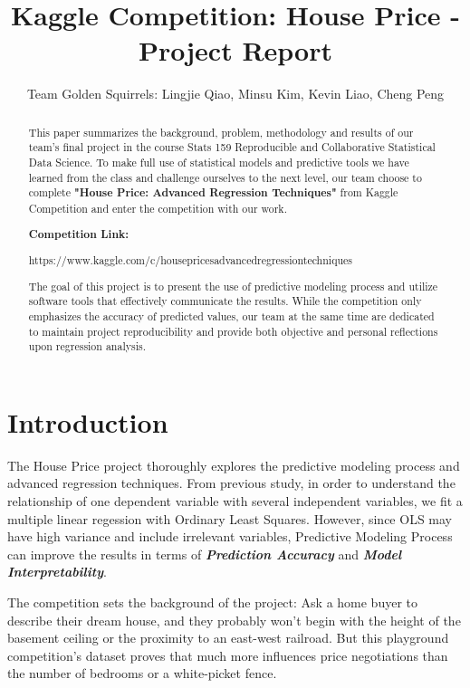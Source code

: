 \documentclass[a4paper]{article}
\title{Kaggle Competition: House Price - Project Report}
\author{Team Golden Squirrels: Lingjie Qiao, Minsu Kim, Kevin Liao, Cheng Peng}
\begin{document}

\maketitle

\begin{abstract}
This paper summarizes the background, problem, methodology and results of our team's final project in the course Stats 159 Reproducible and Collaborative Statistical Data Science. To make full use of statistical models and predictive tools we have learned from the class and challenge ourselves to the next level, our team choose to complete \textbf{"House Price: Advanced Regression Techniques"} from Kaggle Competition and enter the competition with our work. \par

\textbf{Competition Link:} \par
https://www.kaggle.com/c/house\hspace{0pt}prices\hspace{0pt}advanced\hspace{0pt}regression\hspace{0pt}techniques 

The goal of this project is to present the use of predictive modeling process and utilize software tools that effectively communicate the results. While the competition only emphasizes the accuracy of predicted values, our team at the same time are dedicated to maintain project reproducibility and provide both objective and personal reflections upon regression analysis. \par
\end{abstract}

\section{Introduction}
The House Price project thoroughly explores the predictive modeling process and advanced regression techniques. From previous study, in order to understand the relationship of one dependent variable with several independent variables, we fit a multiple linear regession with Ordinary Least Squares. However, since OLS may have high variance and include irrelevant variables, Predictive Modeling Process can improve the results in terms of \textbf{\textit{Prediction Accuracy}} and \textbf{\textit{Model Interpretability}}. \par

The competition sets the background of the project: Ask a home buyer to describe their dream house, and they probably won't begin with the height of the basement ceiling or the proximity to an east-west railroad. But this playground competition's dataset proves that much more influences price negotiations than the number of bedrooms or a white-picket fence. \par
\end{document}
